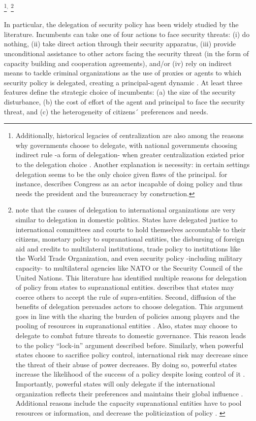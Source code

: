 \documentclass[12pt]{amsart}
\numberwithin{equation}{section}
\theoremstyle{definition}
\theoremstyle{definition}
\theoremstyle{definition}
\begin{document}
\footnote{Additionally, historical legacies of centralization are also among the reasons why governments choose to delegate, with national governments choosing indirect rule -a form of delegation- when greater centralization existed prior to the delegation choice \citep{gerring_etal_2011}. Another explanation is necessity: in certain settings delegation seems to be the only choice given flaws of the principal. \citet{huntington_1995} for instance, describes Congress as an actor incapable of doing policy and thus needs the president and the bureaucracy by construction.}$^,$ \footnote{\citet{Hawkins_etal_2006} note that the causes of delegation to international organizations are very similar to delegation in domestic politics. States have delegated justice to international committees and courts to hold themselves accountable to their citizens, monetary policy to supranational entities, the disbursing of foreign aid and credits to multilateral institutions, trade policy to institutions like the World Trade Organization, and even security policy -including military capacity- to multilateral agencies like NATO or the Security Council of the United Nations. This literature has identified multiple reasons for delegation of policy from states to supranational entities. \citet{Moravcsik_2000} describes that states may coerce others to accept the rule of supra-entities. Second, diffusion of the benefits of delegation persuades actors to choose delegation. This argument goes in line with the sharing the burden of policies among players and the pooling of resources in supranational entities \citep{milner_2011}. Also, states may choose to delegate to combat future threats to domestic governance. This reason leads to the policy ``lock-in'' argument described before. Similarly, when powerful states choose to sacrifice policy control, international risk may decrease since the threat of their abuse of power decreases. By doing so, powerful states increase the likelihood of the success of a policy despite losing control of it \citep{lake_2009, milner_2011}. Importantly, powerful states will only delegate if the international organization reflects their preferences and maintains their global influence \citep{Hawkins_etal_2006}. Additional reasons include the capacity supranational entities have to pool resources or information, and decrease the politicization of policy \citet{Rodrick_1996}. \label{footnote:international_delegation}} 


In particular, the delegation of security policy has been widely studied by the literature. Incumbents can take one of four actions to face security threats: (i) do nothing, (ii) take direct action through their security apparatus, (iii) provide unconditional assistance to other actors facing the security threat (in the form of capacity building and cooperation agreements), and/or (iv) rely on indirect means to tackle criminal organizations as the use of proxies or agents to which security policy is delegated, creating a principal-agent dynamic \citep{berman_lake_2019}. At least three features define the strategic choice of incumbents: (a) the size of the security disturbance, (b) the cost of effort of the agent and principal to face the security threat, and (c) the heterogeneity of citizens´ preferences and needs. 
\end{document}
